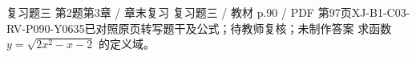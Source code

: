 \par\noindent\begin{minipage}{\linewidth}
\begin{bankitem}{复习题三 第2题}{第3章 / 章末复习 复习题三 / 教材 p.90 / PDF 第97页}{XJ-B1-C03-RV-P090-Y0635}{已对照原页转写题干及公式；待教师复核；未制作答案}
求函数 $y=\sqrt{2x^2-x-2}$ 的定义域。
\end{bankitem}
\end{minipage}\par\medskip
